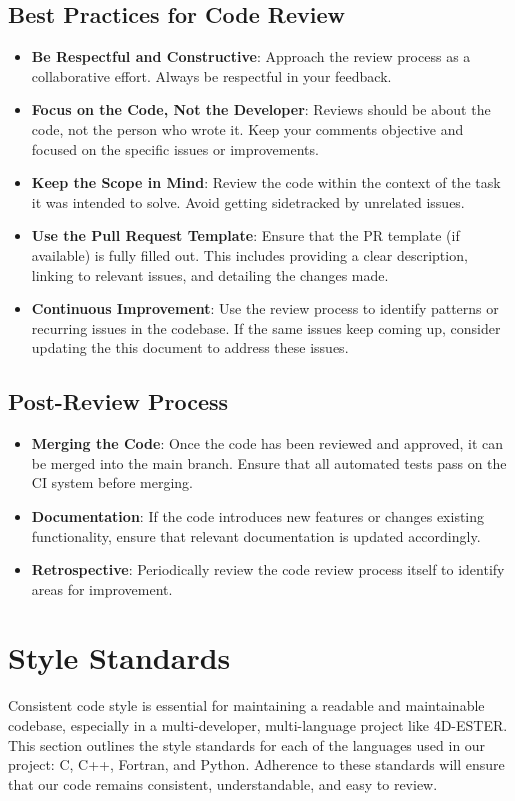 \documentclass{ol-softwaremanual}
\begin{document}
\subsection{Best Practices for Code Review}
\begin{itemize}
    \item \textbf{Be Respectful and Constructive}: Approach the review process as a collaborative effort. Always be respectful in your feedback.
    \item \textbf{Focus on the Code, Not the Developer}: Reviews should be about the code, not the person who wrote it. Keep your comments objective and focused on the specific issues or improvements.
    \item \textbf{Keep the Scope in Mind}: Review the code within the context of the task it was intended to solve. Avoid getting sidetracked by unrelated issues.
    \item \textbf{Use the Pull Request Template}: Ensure that the PR template (if available) is fully filled out. This includes providing a clear description, linking to relevant issues, and detailing the changes made.
    \item \textbf{Continuous Improvement}: Use the review process to identify patterns or recurring issues in the codebase. If the same issues keep coming up, consider updating the this document to address these issues.
\end{itemize}
\subsection{Post-Review Process}
\begin{itemize}
    \item \textbf{Merging the Code}: Once the code has been reviewed and approved, it can be merged into the main branch. Ensure that all automated tests pass on the CI system before merging.
    \item \textbf{Documentation}: If the code introduces new features or changes existing functionality, ensure that relevant documentation is updated accordingly.
    \item \textbf{Retrospective}: Periodically review the code review process
    itself to identify areas for improvement. 
\end{itemize}

\section{Style Standards}
Consistent code style is essential for maintaining a readable and maintainable codebase, especially in a multi-developer, multi-language project like 4D-ESTER. This section outlines the style standards for each of the languages used in our project: C, C++, Fortran, and Python. Adherence to these standards will ensure that our code remains consistent, understandable, and easy to review.
\end{document}
